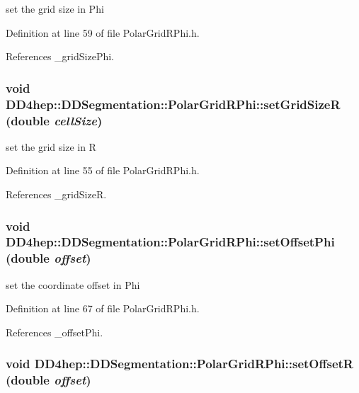 set the grid size in Phi 

Definition at line 59 of file PolarGridRPhi.h.

References \_\-gridSizePhi.\hypertarget{class_d_d4hep_1_1_d_d_segmentation_1_1_polar_grid_r_phi_ab757b018648dc4207f94ab1d13d990ef}{
\subsubsection[{setGridSizeR}]{\setlength{\rightskip}{0pt plus 5cm}void DD4hep::DDSegmentation::PolarGridRPhi::setGridSizeR (double {\em cellSize})}}
\label{class_d_d4hep_1_1_d_d_segmentation_1_1_polar_grid_r_phi_ab757b018648dc4207f94ab1d13d990ef}


set the grid size in R 

Definition at line 55 of file PolarGridRPhi.h.

References \_\-gridSizeR.\hypertarget{class_d_d4hep_1_1_d_d_segmentation_1_1_polar_grid_r_phi_a7724a483741721da3d8418623d75e351}{
\subsubsection[{setOffsetPhi}]{\setlength{\rightskip}{0pt plus 5cm}void DD4hep::DDSegmentation::PolarGridRPhi::setOffsetPhi (double {\em offset})}}
\label{class_d_d4hep_1_1_d_d_segmentation_1_1_polar_grid_r_phi_a7724a483741721da3d8418623d75e351}


set the coordinate offset in Phi 

Definition at line 67 of file PolarGridRPhi.h.

References \_\-offsetPhi.\hypertarget{class_d_d4hep_1_1_d_d_segmentation_1_1_polar_grid_r_phi_ab3ee969820f45192085b4f8a51883dc4}{
\subsubsection[{setOffsetR}]{\setlength{\rightskip}{0pt plus 5cm}void DD4hep::DDSegmentation::PolarGridRPhi::setOffsetR (double {\em offset})}}
\label{class_d_d4hep_1_1_d_d_segmentation_1_1_polar_grid_r_phi_ab3ee969820f45192085b4f8a51883dc4}


